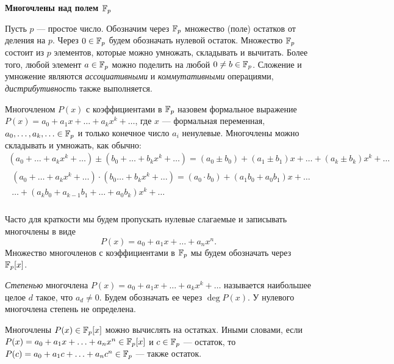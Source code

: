 \documentclass{article}
\begin{document}
    \large


    \begin{center}
        \textbf{Многочлены над полем $\mathbb{F}_p$}
    \end{center}

    Пусть $p$ — простое число.
    Обозначим через $\mathbb{F}_p$ множество (поле) остатков от деления на $p$.
    Через $0 \in \mathbb{F}_p$ будем обозначать нулевой остаток.
    Множество $\mathbb{F}_p$ состоит из $p$ элементов, которые можно умножать, складывать и вычитать.
    Более того, любой элемент $a \in \mathbb{F}_p$ можно поделить на любой $0 \neq b \in \mathbb{F}_p$.
    Сложение и умножение являются \textit{ассоциативными} и \textit{коммутативными} операциями, \textit{дистрибутивность} также выполняется.

    Многочленом $P(x)$ с коэффициентами в $\mathbb{F}_p$ назовем формальное выражение $P(x) = a_0 + a_1 x + \ldots + a_k x^k + \ldots$, где $x$ — формальная переменная, $a_0, \ldots, a_k, \ldots \in \mathbb{F}_p$ и только конечное число $a_i$ ненулевые.
    Многочлены можно складывать и умножать, как обычно:
    \begin{gather*}
    (a_0 + \ldots + a_k x^k + \ldots)
        \pm (b_0 + \ldots + b_k x^k + \ldots) = (a_0 \pm b_0) + (a_1 \pm b_1) x + \ldots + (a_k \pm b_k) x^k + \ldots\\
        \begin{gathered}
        (a_0 + \ldots + a_k x^k + \ldots)
            \cdot (b_0 \ldots + b_k x^k + \ldots) = (a_0 \cdot b_0) + (a_1 b_0 + a_0 b_1) x +\ldots \\ \ldots + (a_k b_0 + a_{k-1} b_1 + \ldots + a_0 b_k) x^k + \ldots
        \end{gathered}\\
    \end{gather*}

    Часто для краткости мы будем пропускать нулевые слагаемые и записывать многочлены в виде
    \[
        P(x) = a_0 + a_1 x + \ldots + a_n x^n.
    \]
    Множество многочленов с коэффициентами в $\mathbb{F}_p$ мы будем обозначать через $\mathbb{F}_p[x]$.

        {\textit{Степенью}} многочлена $P(x) = a_0 + a_1 x + \ldots + a_k x^k + \ldots$ называется наибольшее целое $d$ такое, что $a_d \neq 0$.
    Будем обозначать ее через $\deg P(x)$.
    У нулевого многочлена степень не определена.

    Многочлены $P(x) \in \mathbb{F}_p[x]$ можно вычислять на остатках.
    Иными словами, если $P(x) = a_0 + a_1 x + \ldots + a_n x^n \in \mathbb{F}_p[x]$ и $c \in \mathbb{F}_p$ — остаток, то $P(c) = a_0 + a_1 c + \ldots + a_n c^n \in \mathbb{F}_p$ — также остаток.
\end{document}
